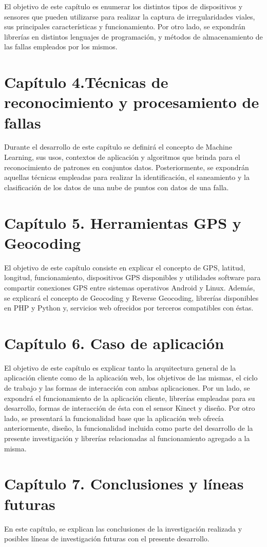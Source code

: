 El objetivo de este capítulo es enumerar los distintos tipos de dispositivos y sensores que pueden utilizarse para realizar la captura de irregularidades viales, sus principales características y funcionamiento. 
Por otro lado, se expondrán librerías en distintos lenguajes de programación, y métodos de almacenamiento de las fallas empleados por los mismos.

\section*{Capítulo 4.Técnicas de reconocimiento y procesamiento de fallas}

Durante el desarrollo de este capítulo se definirá el concepto de Machine Learning, sus usos, contextos de aplicación y algoritmos que brinda para el reconocimiento de patrones en conjuntos datos. Posteriormente, se expondrán aquellas técnicas empleadas para realizar la identificación, el saneamiento y la clasificación de los datos de una nube de puntos con datos de una falla.

\section*{Capítulo 5. Herramientas GPS y Geocoding}

El objetivo de este capítulo consiste en explicar el concepto de GPS, latitud, longitud, funcionamiento, dispositivos GPS disponibles y utilidades software para compartir conexiones GPS entre sistemas operativos Android y Linux. Además, se explicará el concepto de Geocoding y Reverse Geocoding, librerías disponibles en PHP y Python y, servicios web ofrecidos por terceros compatibles con éstas.

\section*{Capítulo 6. Caso de aplicación}

El objetivo de este capítulo es explicar tanto la arquitectura general de la aplicación cliente como de la aplicación web, los objetivos de las mismas, el ciclo de trabajo y las formas de interacción con ambas aplicaciones. 
Por un lado, se expondrá el funcionamiento de la aplicación cliente, librerías empleadas para su desarrollo, formas de interacción de ésta con el sensor Kinect y diseño.
Por otro lado, se presentará la funcionalidad base que la aplicación web ofrecía anteriormente, diseño, la funcionalidad incluida como parte del desarrollo de la presente investigación y librerías relacionadas al funcionamiento agregado a la misma. 

\section*{Capítulo 7. Conclusiones y líneas futuras}

En este capítulo, se explican las conclusiones de la investigación realizada y posibles líneas de investigación futuras con el presente desarrollo.